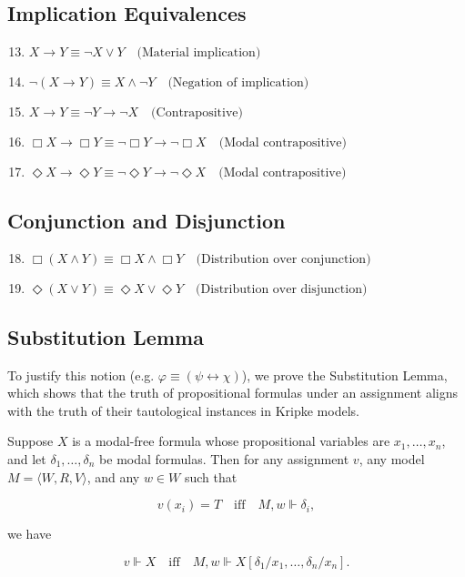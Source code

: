 \documentclass[12pt,a4paper,openany]{article}
\begin{document}
\subsection{Implication Equivalences}
\begin{enumerate}
\setcounter{enumi}{12}
\item $X \to Y \equiv \neg X \lor Y \quad \text{(Material implication)}$
\item $\neg(X \to Y) \equiv X \land \neg Y \quad \text{(Negation of implication)}$
\item $X \to Y \equiv \neg Y \to \neg X \quad \text{(Contrapositive)}$
\item $\Box X \to \Box Y \equiv \neg \Box Y \to \neg \Box X \quad \text{(Modal contrapositive)}$
\item $\Diamond X \to \Diamond Y \equiv \neg \Diamond Y \to \neg \Diamond X \quad \text{(Modal contrapositive)}$
\end{enumerate}

\subsection{Conjunction and Disjunction}
\begin{enumerate}
\setcounter{enumi}{17}
\item $\Box(X \land Y) \equiv \Box X \land \Box Y \quad \text{(Distribution over conjunction)}$
\item $\Diamond(X \lor Y) \equiv \Diamond X \lor \Diamond Y \quad \text{(Distribution over disjunction)}$
\end{enumerate}
\subsection{Substitution Lemma}

To justify this notion (e.g. $\varphi \equiv (\psi \leftrightarrow \chi)$), we prove the Substitution Lemma, which shows that the truth of propositional formulas under an assignment aligns with the truth of their tautological instances in Kripke models.

Suppose $X$ is a modal-free formula whose propositional variables are $x_1, \ldots, x_n$, and let $\delta_1, \ldots, \delta_n$ be modal formulas. Then for any assignment $v$, any model $M = \langle W, R, V \rangle$, and any $w \in W$ such that

$$v(x_i) = T \quad \text{iff} \quad M,w \Vdash \delta_i,$$

we have

$$v \Vdash X \quad \text{iff} \quad M,w \Vdash X[\delta_1/x_1, \ldots, \delta_n/x_n].$$
\end{document}
